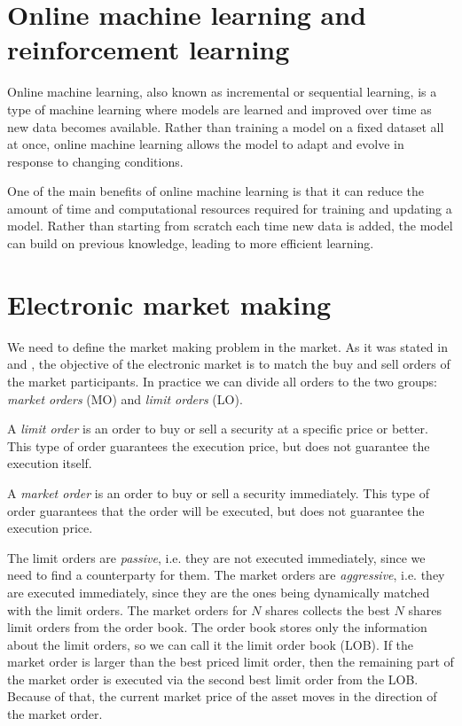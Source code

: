 \section{Online machine learning and reinforcement learning}
    Online machine learning, also known as incremental or sequential learning, is a type of machine learning where models are learned and improved over time as new data becomes available. Rather than training a model on a fixed dataset all at once, online machine learning allows the model to adapt and evolve in response to changing conditions.

    One of the main benefits of online machine learning is that it can reduce the amount of time and computational resources required for training and updating a model. Rather than starting from scratch each time new data is added, the model can build on previous knowledge, leading to more efficient learning.


\section{Electronic market making}
    We need to define the market making problem in the market. As it was stated in \cite{Cartea2015} and \cite{Bouchaud2018},
    the objective of the electronic market is to match the buy and sell orders 
    of the market participants. In practice we can divide all orders to 
    the two groups: \emph{market orders} (MO) and \emph{limit orders} (LO). 
    \begin{definition}
        A \emph{limit order} is an order to buy or sell a security at a specific price or better. This type of order guarantees the execution price, but does not guarantee the execution itself.
    \end{definition}
    \begin{definition}
        A \emph{market order} is an order to buy or sell a security immediately. This type of order guarantees that the order will be executed, but does not guarantee the execution price.
    \end{definition}
    
    The limit orders are \emph{passive}, i.e. they are not executed immediately, since 
    we need to find a counterparty for them. The market orders are \emph{aggressive},
    i.e. they are executed immediately, since they are the ones being dynamically matched with the limit orders. 
    The market orders for $N$ shares collects the best $N$ shares limit orders from the order book.
    The order book stores only the information about the limit orders, so we can call it the limit order book (LOB).
    If the market order is larger than the best priced limit order, then the remaining part of the 
    market order is executed via the second best limit order from the LOB. Because of that, the current 
    market price of the asset moves in the direction of the market order.

